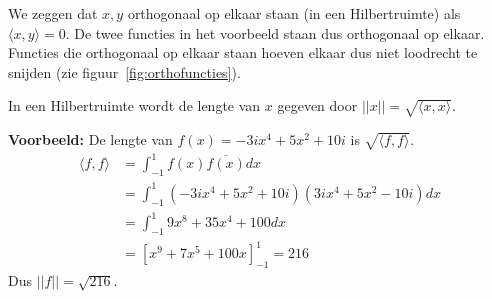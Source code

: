 \documentclass[../../main.tex]{subfiles}
\begin{document}
We zeggen dat $x,y$ orthogonaal op elkaar staan (in een Hilbertruimte) als $\langle x,y\rangle =0$.
De twee functies in het voorbeeld staan dus orthogonaal op elkaar. Functies die orthogonaal op elkaar staan hoeven elkaar dus niet loodrecht te snijden (zie figuur~\ref{fig:orthofuncties}).

In een Hilbertruimte wordt de lengte van $x$ gegeven door $||x||=\sqrt{\langle x,x\rangle}$.

\textbf{Voorbeeld:} De lengte van $f(x)=-3ix^4+5x^2+10i$ is $\sqrt{\langle f,f\rangle}$.
\begin{align*}
    \langle f,f\rangle
    &= \int_{-1}^1 f(x)\overline{f(x)}  dx\\
    &= \int_{-1}^1 (-3ix^4+5x^2+10i)(3ix^4+5x^2-10i) dx\\
    &= \int_{-1}^1 9x^8+35x^4+100 dx\\
    &= \left[x^9+7x^5+100x\right]_{-1}^1=216
\end{align*}
Dus $||f||=\sqrt{216}$.
\end{document}
